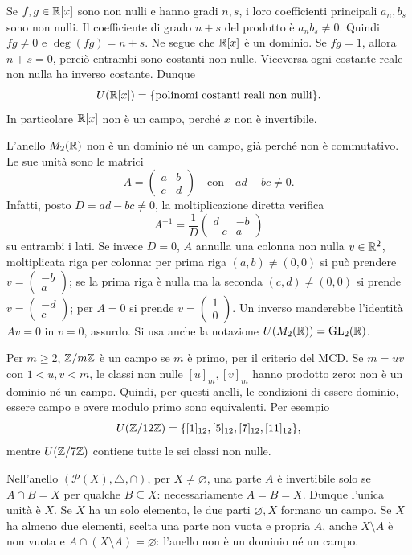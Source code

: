 \begin{esempio}
Se $f,g\in\mathbb{R}[x]$ sono non nulli e hanno gradi $n,s$, i loro coefficienti principali $a_n,b_s$ sono non nulli. Il coefficiente di grado $n+s$ del prodotto è $a_nb_s\ne0$. Quindi $fg\ne0$ e $\deg(fg)=n+s$. Ne segue che $\mathbb{R}[x]$ è un dominio. Se $fg=1$, allora $n+s=0$, perciò entrambi sono costanti non nulle. Viceversa ogni costante reale non nulla ha inverso costante. Dunque
\[
U(\mathbb{R}[x])=\{\text{polinomi costanti reali non nulli}\}.
\]
In particolare $\mathbb{R}[x]$ non è un campo, perché $x$ non è invertibile.

L'anello $M_2(\mathbb{R})$ non è un dominio né un campo, già perché non è commutativo. Le sue unità sono le matrici
\[
A=\begin{pmatrix}a&b\\c&d\end{pmatrix}\quad\text{con}\quad ad-bc\ne0.
\]
Infatti, posto $D=ad-bc\ne0$, la moltiplicazione diretta verifica
\[
A^{-1}=\frac1D\begin{pmatrix}d&-b\\-c&a\end{pmatrix}
\]
su entrambi i lati. Se invece $D=0$, $A$ annulla una colonna non nulla $v\in\mathbb{R}^2$, moltiplicata riga per colonna: per prima riga $(a,b)\ne(0,0)$ si può prendere $v=\left(\begin{smallmatrix}-b\\a\end{smallmatrix}\right)$; se la prima riga è nulla ma la seconda $(c,d)\ne(0,0)$ si prende $v=\left(\begin{smallmatrix}-d\\c\end{smallmatrix}\right)$; per $A=0$ si prende $v=\left(\begin{smallmatrix}1\\0\end{smallmatrix}\right)$. Un inverso manderebbe l'identità $Av=0$ in $v=0$, assurdo. Si usa anche la notazione $U(M_2(\mathbb{R}))=\operatorname{GL}_2(\mathbb{R})$.
\end{esempio}

\begin{esempio}
Per $m\ge2$, $\mathbb{Z}/m\mathbb{Z}$ è un campo se $m$ è primo, per il criterio del MCD. Se $m=uv$ con $1<u,v<m$, le classi non nulle $[u]_m,[v]_m$ hanno prodotto zero: non è un dominio né un campo. Quindi, per questi anelli, le condizioni di essere dominio, essere campo e avere modulo primo sono equivalenti. Per esempio
\[
U(\mathbb{Z}/12\mathbb{Z})=\{[1]_{12},[5]_{12},[7]_{12},[11]_{12}\},
\]
mentre $U(\mathbb{Z}/7\mathbb{Z})$ contiene tutte le sei classi non nulle.

Nell'anello $(\mathcal P(X),\triangle,\cap)$, per $X\ne\varnothing$, una parte $A$ è invertibile solo se $A\cap B=X$ per qualche $B\subseteq X$: necessariamente $A=B=X$. Dunque l'unica unità è $X$. Se $X$ ha un solo elemento, le due parti $\varnothing,X$ formano un campo. Se $X$ ha almeno due elementi, scelta una parte non vuota e propria $A$, anche $X\setminus A$ è non vuota e $A\cap(X\setminus A)=\varnothing$: l'anello non è un dominio né un campo.
\end{esempio}

